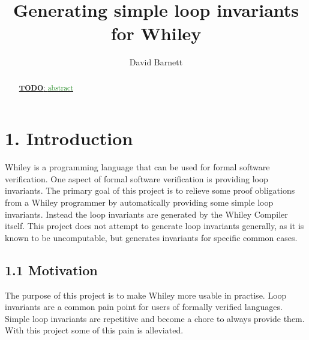 \documentclass[11pt, a4paper, twoside, openright]{report}
\title{Generating simple loop invariants for Whiley}
\author{David Barnett}
\date{}
\newcommand{\todo}[1]{\huge{\underline{\textbf{\textcolor{RubineRed}{TODO}}: \textcolor{ForestGreen}{#1}}}\normalsize }
\begin{document}
\frontmatter


\begin{abstract}
    \todo{abstract}
\end{abstract}


\maketitle


\mainmatter{}

\section*{1. Introduction}

Whiley is a programming language that can be used for formal software
verification. One aspect of formal software verification is providing loop
invariants.
The primary goal of this project is to relieve some proof obligations from a
Whiley programmer by automatically providing some simple loop invariants.
Instead the loop invariants are generated by the Whiley Compiler itself.
This project does not attempt to generate loop invariants generally, as it is
known to be uncomputable, but generates invariants for specific common cases.

\subsection*{1.1 Motivation}

The purpose of this project is to make Whiley more usable in practise.
Loop invariants are a common pain point for users of formally verified
languages. Simple loop invariants are repetitive and become a chore to
always provide them. With this project some of this pain is alleviated.
\end{document}
